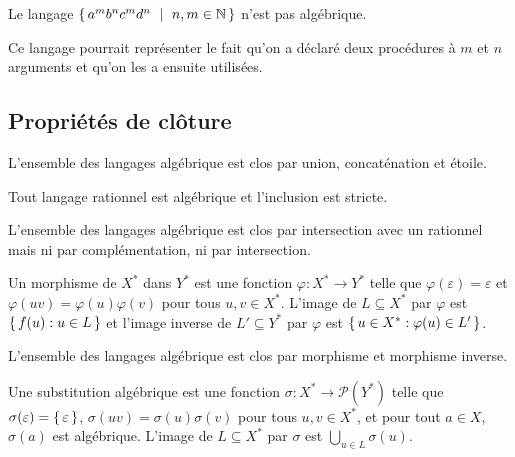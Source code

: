 \documentclass[../../agregation.tex]{subfiles}
\begin{document}
\begin{application}
	Le langage $\set{a^{m}b^{n}c^{m}d^{n}\ |\ n,m\in\N}$ n'est pas algébrique.
	
	Ce langage pourrait représenter le fait qu'on a déclaré deux procédures
	à $m$ et $n$ arguments et qu'on les a ensuite utilisées. %
\end{application}

\subsection{Propriétés de clôture}

\begin{prop}
	L'ensemble des langages algébrique est clos par union, concaténation et étoile.
\end{prop}

\begin{prop}
	Tout langage rationnel est algébrique et l'inclusion est stricte.
\end{prop}

\begin{prop}
	L'ensemble des langages algébrique est clos par intersection avec un rationnel mais ni par complémentation, ni par intersection.
\end{prop}

\begin{defn}[Morphisme]
	Un morphisme de $X^*$ dans $Y^*$ est une fonction $\varphi:X^*\to Y^*$ telle que $\varphi(\varepsilon) = \varepsilon$ et $\varphi(uv)=\varphi(u)\varphi(v)$ pour tous $u,v\in X ^*$. L'image de $L\subseteq X^*$ par $\varphi$ est $\set{f(u) : u \in L}$ et l'image inverse de $L'\subseteq Y^*$ par $\varphi$ est $\set{u \in X^* : \varphi(u) \in L'}$.
\end{defn}

\begin{prop}
	L'ensemble des langages algébrique est clos par morphisme et morphisme inverse.
\end{prop}

\begin{defn}
	Une substitution algébrique est une fonction $\sigma:X^*\to \mathcal{P}(Y^*)$ telle que $\sigma(\varepsilon)=\set{\varepsilon}$, $\sigma(uv)=\sigma(u)\sigma(v)$ pour tous $u,v\in X ^*$, et pour tout $a\in X$, $\sigma(a)$ est algébrique. L'image de $L\subseteq X^*$ par $\sigma$ est $\underset{u\in L}{\bigcup}\sigma(u)$.
\end{defn}
\end{document}
